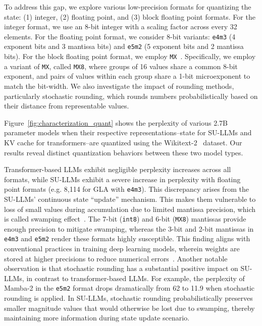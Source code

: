%
%
To address this gap, we explore various low-precision formats for
quantizing the state: (1) integer, (2) floating point, and (3) block
floating point formats.
%
For the integer format, we use an 8-bit integer with a scaling factor
across every 32 elements.
%
For the floating point format, we consider 8-bit variants:
\texttt{e4m3} (4 exponent bits and 3 mantissa bits) and \texttt{e5m2}
(5 exponent bits and 2 mantissa bits).
%
For the block floating point format, we employ
\texttt{MX}~\cite{rouhani2023shared}.
%
Specifically, we employ a variant of \texttt{MX}, called
\texttt{MX8}, where groups of 16 values share a common 8-bit
exponent, and pairs of values within each group share a 1-bit
microexponent to match the bit-width.
%
We also investigate the impact of rounding methods, particularly
stochastic rounding, which rounds numbers probabilistically based on
their distance from representable values.
%

%
%
Figure~\ref{fig:characterization_quant} shows the perplexity of
various 2.7B parameter models when their respective
representations--state for SU-LLMs and KV cache for transformers--are
quantized using the Wikitext-2~\cite{merity2016pointer} dataset.
%
Our results reveal distinct quantization behaviors between these two
model types.
%

%
Transformer-based LLMs exhibit negligible perplexity increases across
all formats, while SU-LLMs exhibit a severe increase in perplexity
with floating point formats (e.g. 8,114 for GLA with \texttt{e4m3}).
%
This discrepancy arises from the SU-LLMs' continuous state ``update'' mechanism.
%
This makes them vulnerable to loss of small values during
accumulation due to limited mantissa precision, which is called
swamping effect~\cite{swamping, wang2018training}.
%
The 7-bit (\texttt{int8}) and 6-bit (\texttt{MX8}) mantissas provide
enough precision to mitigate swamping, whereas the 3-bit and 2-bit
mantissas in \texttt{e4m3} and \texttt{e5m2} render these formats
highly susceptible.
%
This finding aligns with conventional practices in training deep
learning models, wherein weights are stored at higher precisions to
reduce numerical errors~\cite{micikevicius2018mixed}.
%
Another notable observation is that stochastic rounding has a
substantial positive impact on SU-LLMs, in contrast to transformer-based LLMs.
%
For example, the perplexity of Mamba-2 in the \texttt{e5m2} format
drops dramatically from 62 to 11.9 when stochastic rounding is applied.
%
In SU-LLMs, stochastic rounding probabilistically preserves smaller
magnitude values that would otherwise be lost due to swamping,
thereby maintaining more information during state update scenario.
%


